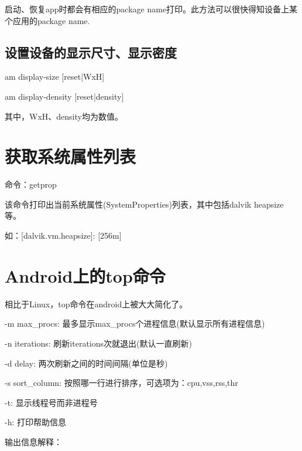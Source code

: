﻿\documentclass[a4paper,11pt]{article}
\begin{document}
  启动、恢复app时都会有相应的package name打印。此方法可以很快得知设备上某个应用的package name.

  \subsection[设置设备的显示尺寸、显示密度]{设置设备的显示尺寸、显示密度}
  am display-size [reset|WxH]

  am display-density [reset|density]

  其中，WxH、density均为数值。

  \section[获取系统属性列表]{获取系统属性列表}
  \hspace*{2ex}命令：getprop\par\vspace{2ex}
  该命令打印出当前系统属性(SystemProperties)列表，其中包括dalvik heapsize等。\par
  如：[dalvik.vm.heapsize]: [256m]

  \section[Android上的top命令]{Android上的top命令}
  相比于Linux，top命令在android上被大大简化了。
  \begin{coloredenumerate}
    \item -m max\_procs: 最多显示max\_procs个进程信息(默认显示所有进程信息)
    \item -n iterations: 刷新iterations次就退出(默认一直刷新)
    \item -d delay: 两次刷新之间的时间间隔(单位是秒)
    \item -s sort\_column: 按照哪一行进行排序，可选项为：cpu,vss,rss,thr
    \item -t: 显示线程号而非进程号
    \item -h: 打印帮助信息
  \end{coloredenumerate}
  输出信息解释：
\end{document}
